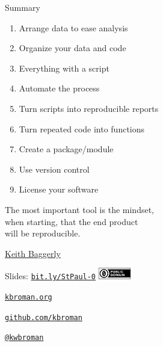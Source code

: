 \documentclass[12pt,t]{beamer}
\begin{document}
\begin{frame}[c]{Summary}

\small
    \begin{enumerate}
    \item Arrange data to ease analysis
    \item Organize your data and code
    \item Everything with a script
    \item Automate the process
    \item Turn scripts into reproducible reports
    \item Turn repeated code into functions
    \item Create a package/module
    \item Use version control
    \item License your software
    \end{enumerate}

\end{frame}



\begin{frame}[c]{}

\begin{center}
\large
The most important tool is the {\hilit mindset},\\
when starting, that the end product \\
will be reproducible.
\end{center}

\hfill
{\lolit
{\textendash} \href{http://odin.mdacc.tmc.edu/~kabaggerly/}{Keith Baggerly}
}

\end{frame}



\begin{frame}[c]{}

\Large

Slides: \href{http://bit.ly/StPaul-0}{\tt bit.ly/StPaul-0} \quad
\includegraphics[height=5mm]{Figs/cc-zero.png}

\vspace{10mm}

\href{http://kbroman.org}{\tt \lolit kbroman.org}

\vspace{10mm}

\href{https://github.com/kbroman}{\tt \lolit github.com/kbroman}

\vspace{10mm}

\href{https://twitter.com/kwbroman}{\tt \lolit @kwbroman}


\end{frame}
\end{document}
